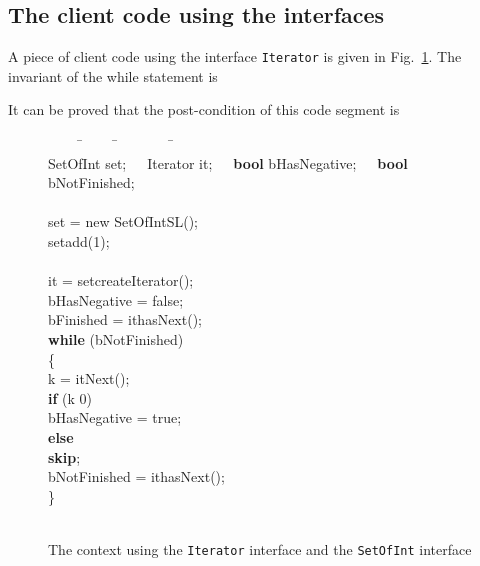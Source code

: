 \documentclass[fleqn]{llncs}
\begin{document}
\subsection{The client code using the interfaces}
A piece of client code using the interface \texttt{Iterator} is given in Fig.~\ref{FIG-ITERATOR-CONTEXT}. The
invariant of the while statement is

It can be proved that the post-condition of this code segment is

\begin{figure}
\begin{center}
\begin{boxedminipage}{1.0\textwidth}
{\scriptsize
\begin{tabbing}
\ \ \ \ \=\ \ \ \ \ \=\ \ \ \ \ \ \ \ \=\ \ \ \ \=\\
SetOfInt set;\ \ \ Iterator it;\ \ \ \textbf{bool}    bHasNegative;\ \ \ \textbf{bool} bNotFinished;\\
\\
set = new SetOfIntSL();\\
set{\fldacc}add(1);\\
\ \ \ \ \ \ \ \ \\
it = set{\fldacc}createIterator();\\

bHasNegative = false;\\
bFinished = it{\fldacc}hasNext();\\
\textbf{while} (bNotFinished)\\
\{\\
    \>k = it{\fldacc}Next();\\
    \>\textbf{if} (k  0)\\
    \>  \>bHasNegative = true;\\
    \>\textbf{else}\\
    \>  \>\textbf{skip};\\
    \>bNotFinished = it{\fldacc}hasNext();\\
\}\\
\\
\end{tabbing}
}
\end{boxedminipage}
\end{center}
\caption{The context using the \texttt{Iterator} interface and the \texttt{SetOfInt} interface}\label{FIG-ITERATOR-CONTEXT}
\end{figure}

\newpage
\end{document}
